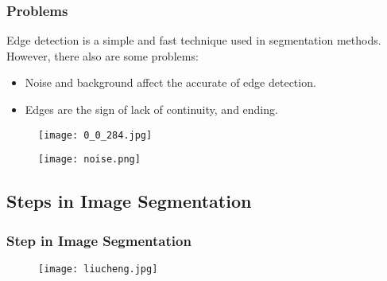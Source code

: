 \documentclass[notheorems,serif,table,compress]{beamer}  %
\begin{document}
\begin{frame}
\frametitle{Problems}
Edge detection is a simple and fast technique used in segmentation methods. However, there also are some problems:
    \begin{itemize}
    \item Noise and background affect the accurate of edge detection.
    \item {\color{blue}Edges are the sign of lack of continuity, and ending.}
    \end{itemize}
    \begin{figure}
    \begin{minipage}[t]{0.4\linewidth}
    \centering
    \texttt{[image: 0\_0\_284.jpg]} 
    \end{minipage}
    \begin{minipage}[t]{0.4\linewidth}
    \centering
    \texttt{[image: noise.png]} 
    \end{minipage}
    \end{figure}
\end{frame}

\subsection{Steps in Image Segmentation}
\begin{frame}
\frametitle{Step in Image Segmentation}
    \begin{figure}
    \texttt{[image: liucheng.jpg]} 
    \end{figure}
\end{frame}



\begin{comment}
\section{边缘检测}

\begin{frame}
\frametitle{边缘检测方法}
\begin{itemize}
\item Roberts算子
\item Sobel算子
\item Prewitt算子
\item Kirsch算子
\item Marr-Hildreth 边缘检测
\item LoG算子
\item Canny算子
\end{itemize}
\end{frame}
\end{comment}
\end{document}
